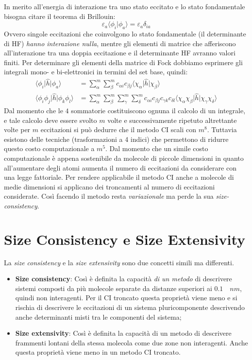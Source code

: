 \documentclass[oneside]{amsbook}
\numberwithin{section}{chapter}
\numberwithin{equation}{section}
\numberwithin{figure}{section}
\begin{document}
In merito all'energia di interazione tra uno stato eccitato e lo stato fondamentale bisogna citare il teorema di Brillouin:
\begin{equation}
\varepsilon_a \langle\phi_i\vert\phi_a\rangle = \varepsilon_a \delta_{ia}
\end{equation}
Ovvero singole eccitazioni che coinvolgono lo stato fondamentale (il determinante di HF)\emph{ hanno interazione nulla}, mentre gli elementi di matrice che afferiscono all'interazione tra una doppia eccitazione e il determinante HF avranno valori finiti. Per determinare gli elementi della matrice di Fock dobbiamo esprimere gli integrali mono- e bi-elettronici in termini del set base, quindi:
\begin{equation}
\begin{aligned}
\langle\phi_i\vert\hat{h}\vert\phi_a\rangle &= \sum\limits _{\alpha}^m \sum\limits _{\beta}^m c_{\alpha i} c_{\beta j} \langle\chi_{\alpha}\vert\hat{h}\vert\chi_{\beta}\rangle \\
\langle\phi_i\phi_j\vert\hat{h}\vert\phi_k\phi_l\rangle &= \sum\limits _{\alpha}^m \sum\limits _{\beta}^m \sum\limits _{\gamma}^m \sum\limits _{\delta}^m c_{\alpha i} c_{\beta j}c_{\gamma k} c_{\delta l}\langle	\chi_\alpha\chi_\beta\vert\hat{h}\vert\chi_\gamma\chi_\delta\rangle
\end{aligned}
\end{equation}
Dal momento che le $4$ sommatorie costituiscono ognuna il calcolo di un integrale, e tale calcolo deve essere svolto $m$ volte e successivamente ripetuto altrettante volte per $m$ eccitazioni si può dedurre che il metodo CI scali con $m^8$. Tuttavia esistono delle tecniche (trasformazioni a 4 indici) che permettono di ridurre questo costo computazionale a $m^5$. 
Dal momento che un simile costo computazionale è appena sostenibile da molecole di piccole dimensioni in quanto all'aumentare degli atomi aumenta il numero di eccitazioni da considerare con una legge fattoriale. Per rendere applicabile il metodo CI anche a molecole di medie dimensioni si applicano dei troncamenti al numero di eccitazioni considerate.
Così facendo il metodo resta \emph{variazionale} ma perde la sua \emph{size-consistency}.
\section{Size Consistency e Size Extensivity}
La \emph{size consistency} e la \emph{size extensivity} sono due concetti simili ma differenti. 
\begin{itemize}
\item \textbf{Size consistency}: Così è definita la capacità \emph{di un metodo} di descrivere sistemi composti da più molecole separate da distanze superiori ai $0.1 \quad nm$, quindi non interagenti. Per il CI troncato questa proprietà viene meno e si rischia di descrivere le eccitazioni di un sistema pluricomponente descrivendo anche determinanti misti tra le componenti del sistema;
\item \textbf{Size extensivity}: Così è definita la capacità di un metodo di descrivere frammenti lontani della stessa molecola come due zone non interagenti. Anche questa proprietà viene meno in un metodo CI troncato.
\end{itemize}
\end{document}
